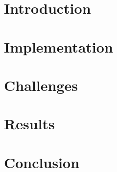 \documentclass[12pt]{report}
\numberwithin{figure}{chapter}
\begin{document}
\chapter{Introduction}

\chapter{Implementation}
 

\chapter{Challenges}


\chapter{Results}
 

\chapter{Conclusion}
 
\end{document}
